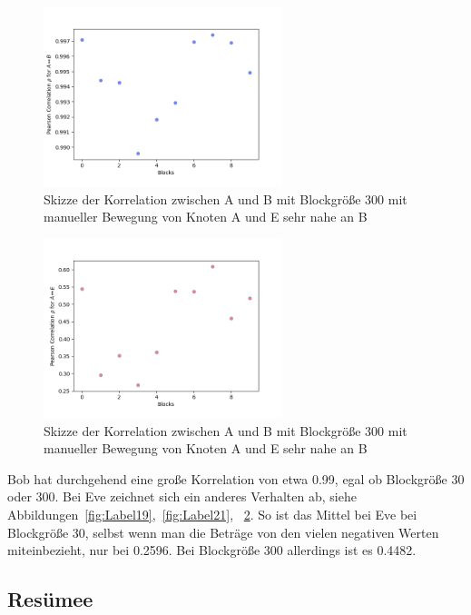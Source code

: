 \documentclass[12pt,a4paper]{article}
\begin{document}
\begin{figure}[hbt!]
	\centering
		\includegraphics[width=0.62\textwidth ]
		{Bilder/a3-t5-block300-correlation-AB.png}
		\caption{Skizze der Korrelation zwischen A und B mit Blockgröße 300 mit manueller Bewegung von Knoten A und E sehr nahe an B}
		\label{fig:Label22}
\end{figure}

\begin{figure}[hbt!]
	\centering
		\includegraphics[width=0.62\textwidth ]
		{Bilder/a3-t5-block300-correlation-AE.png}
		\caption{Skizze der Korrelation zwischen A und B mit Blockgröße 300 mit manueller Bewegung von Knoten A und E sehr nahe an B}
		\label{fig:Label23}
\end{figure}


Bob hat durchgehend eine große Korrelation von
etwa 0.99, egal ob Blockgröße 30 oder 300. Bei Eve zeichnet sich ein 
anderes Verhalten ab, siehe Abbildungen~\ref{fig:Label19},~\ref{fig:Label21},
~\ref{fig:Label23}. So ist das Mittel bei Eve bei Blockgröße 30, selbst 
wenn man die Beträge von den vielen negativen Werten miteinbezieht, nur 
bei 0.2596. Bei Blockgröße 300 allerdings ist es 0.4482.


\subsection{Resümee}
\end{document}
